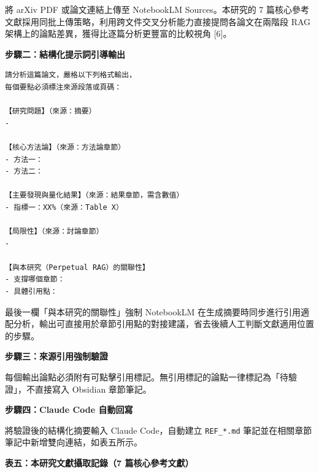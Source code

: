 將 arXiv PDF 或論文連結上傳至 NotebookLM Sources。本研究的 7
篇核心參考文獻採用同批上傳策略，利用跨文件交叉分析能力直接提問各論文在兩階段
RAG 架構上的論點差異，獲得比逐篇分析更豐富的比較視角 {[}6{]}。

\textbf{步驟二：結構化提示詞引導輸出}

\begin{verbatim}
請分析這篇論文，嚴格以下列格式輸出，
每個要點必須標注來源段落或頁碼：

【研究問題】（來源：摘要）
-

【核心方法論】（來源：方法論章節）
- 方法一：
- 方法二：

【主要發現與量化結果】（來源：結果章節，需含數值）
- 指標一：XX%（來源：Table X）

【局限性】（來源：討論章節）
-

【與本研究（Perpetual RAG）的關聯性】
- 支撐哪個章節：
- 具體引用點：
\end{verbatim}

最後一欄「與本研究的關聯性」強制 NotebookLM
在生成摘要時同步進行引用適配分析，輸出可直接用於章節引用點的對接建議，省去後續人工判斷文獻適用位置的步驟。

\textbf{步驟三：來源引用強制驗證}

每個輸出論點必須附有可點擊引用標記。無引用標記的論點一律標記為「待驗證」，不直接寫入
Obsidian 章節筆記。

\textbf{步驟四：Claude Code 自動回寫}

將驗證後的結構化摘要輸入 Claude Code，自動建立 \texttt{REF\_*.md}
筆記並在相關章節筆記中新增雙向連結，如表五所示。

\textbf{表五：本研究文獻攝取記錄（7 篇核心參考文獻）}

